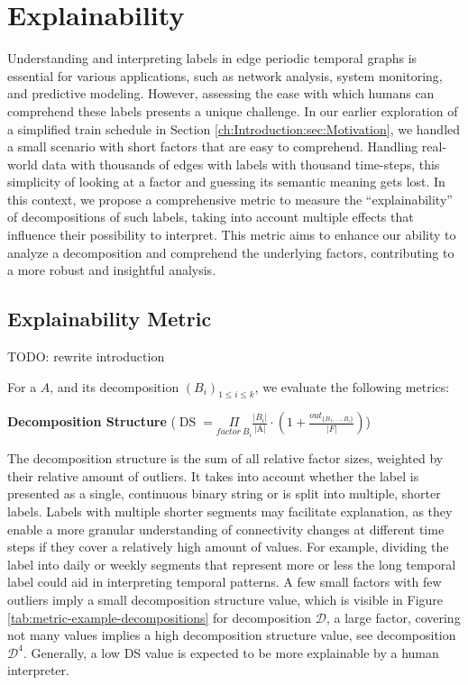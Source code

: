 \chapter{Explainability}
\label{ch:explainability}
Understanding and interpreting labels in edge periodic temporal graphs is essential for various applications, such as network analysis, system monitoring, and predictive modeling.
However, assessing the ease with which humans can comprehend these labels presents a unique challenge.
In our earlier exploration of a simplified train schedule in Section \ref{ch:Introduction:sec:Motivation}, we handled a small scenario with short factors that are easy to comprehend.
Handling real-world data with thousands of edges with labels with thousand time-steps, this simplicity of looking at a factor and guessing its semantic meaning gets lost.
In this context, we propose a comprehensive metric to measure the \enquote{explainability} of decompositions of such labels, taking into account multiple effects that influence their possibility to interpret.
This metric aims to enhance our ability to analyze a decomposition and comprehend the underlying factors, contributing to a more robust and insightful analysis.

\section{Explainability Metric}
\label{ch:explainability:metric}
TODO: rewrite introduction

For a \DFA $A$, and its decomposition $(B_i)_{1 \leq i \leq k}$, we evaluate the following metrics:

\textbf{Decomposition Structure} ($\operatorname{DS} =  \underset{factor~ B_i}{\Pi}\frac{|B_i|}{\text{|A|}} \cdot (1 + \frac{out_{\{B_1,\dots,B_i\}}}{|F|})$)

The decomposition structure is the sum of all relative factor sizes, weighted by their relative amount of outliers.
It takes into account whether the label is presented as a single, continuous binary string or is split into multiple, shorter labels.
Labels with multiple shorter segments may facilitate explanation, as they enable a more granular understanding of connectivity changes at different time steps if they cover a relatively high amount of values.
For example, dividing the label into daily or weekly segments that represent more or less the long temporal label could aid in interpreting temporal patterns.
A few small factors with few outliers imply a small decomposition structure value, which is visible in Figure \ref{tab:metric-example-decompositions} for decomposition $\mathcal{D}$, a large factor, covering not many values implies a high decomposition structure value, see decomposition $\mathcal{D}^4$.
Generally, a low DS value is expected to be more explainable by a human interpreter. 

